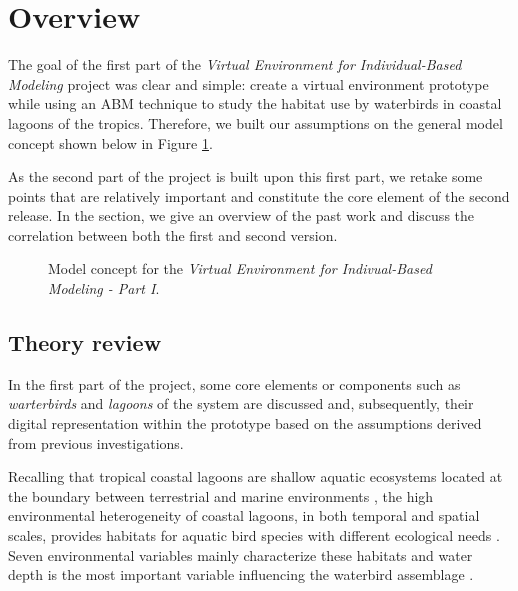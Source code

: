 %
%
%


\section{Overview}\label{sec:overview}
The goal of the first part of the \emph{Virtual Environment for Individual-Based Modeling} project was clear and simple: create a virtual environment prototype while using an ABM technique to study the habitat use by waterbirds in coastal lagoons of the tropics. Therefore, we built our assumptions on the general model concept shown below in Figure \ref{fig:concept-1v}.

As the second part of the project is built upon this first part, we retake some points that are relatively important and constitute the core element of the second release. In the section, we give an overview of the past work and discuss the correlation between both the first and second version.

\begin{figure}[!ht]
    \centering
    \caption{Model concept for the \emph{Virtual Environment for Indivual-Based Modeling - Part I}.}
    \label{fig:concept-1v}
\end{figure}

\subsection{Theory review}
In the first part of the project, some core elements or components such as  \emph{warterbirds} and \emph{lagoons} of the system are discussed and, subsequently, their digital representation within the prototype based on the assumptions derived from previous investigations.

Recalling that tropical coastal lagoons are shallow aquatic ecosystems located at the boundary between terrestrial and marine environments \cite{tavares2015environmental}, the high environmental heterogeneity of coastal lagoons, in both temporal and spatial scales, provides habitats for aquatic bird species with different ecological needs \cite{ntiamoa1998water, paracuellos2004factors, tavares2013inventory}. Seven environmental variables mainly characterize these habitats and water depth is the most important variable influencing the waterbird assemblage \cite{tavares2015environmental}.

